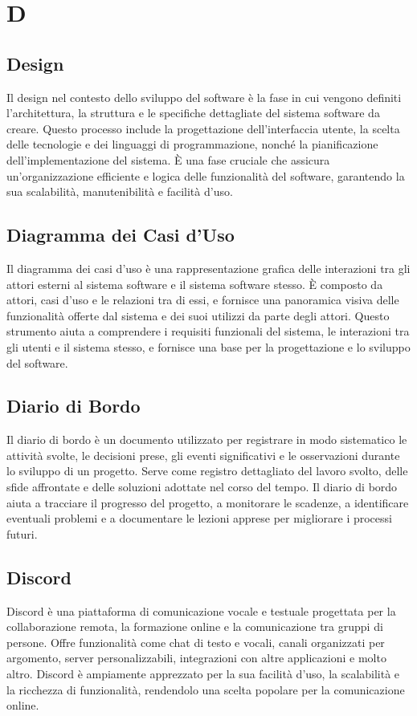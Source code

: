 \section{D}
\subsection{Design}
Il design nel contesto dello sviluppo del software è la fase in cui vengono
definiti l'architettura, la struttura e le specifiche dettagliate del sistema
software da creare. Questo processo include la progettazione dell'interfaccia
utente, la scelta delle tecnologie e dei linguaggi di programmazione, nonché la
pianificazione dell'implementazione del sistema. È una fase cruciale che
assicura un'organizzazione efficiente e logica delle funzionalità del software,
garantendo la sua scalabilità, manutenibilità e facilità d'uso.
\subsection{Diagramma dei Casi d'Uso}
Il diagramma dei casi d'uso è una rappresentazione grafica delle interazioni
tra gli attori esterni al sistema software e il sistema software stesso. È
composto da attori, casi d'uso e le relazioni tra di essi, e fornisce una
panoramica visiva delle funzionalità offerte dal sistema e dei suoi utilizzi da
parte degli attori. Questo strumento aiuta a comprendere i requisiti funzionali
del sistema, le interazioni tra gli utenti e il sistema stesso, e fornisce una
base per la progettazione e lo sviluppo del software.
\subsection{Diario di Bordo}
Il diario di bordo è un documento utilizzato per registrare in modo sistematico
le attività svolte, le decisioni prese, gli eventi significativi e le
osservazioni durante lo sviluppo di un progetto. Serve come registro
dettagliato del lavoro svolto, delle sfide affrontate e delle soluzioni
adottate nel corso del tempo. Il diario di bordo aiuta a tracciare il progresso
del progetto, a monitorare le scadenze, a identificare eventuali problemi e a
documentare le lezioni apprese per migliorare i processi futuri.
\subsection{Discord}
Discord è una piattaforma di comunicazione vocale e testuale progettata per la
collaborazione remota, la formazione online e la comunicazione tra gruppi di
persone. Offre funzionalità come chat di testo e vocali, canali organizzati per
argomento, server personalizzabili, integrazioni con altre applicazioni e molto
altro. Discord è ampiamente apprezzato per la sua facilità d'uso, la
scalabilità e la ricchezza di funzionalità, rendendolo una scelta popolare per
la comunicazione online.
